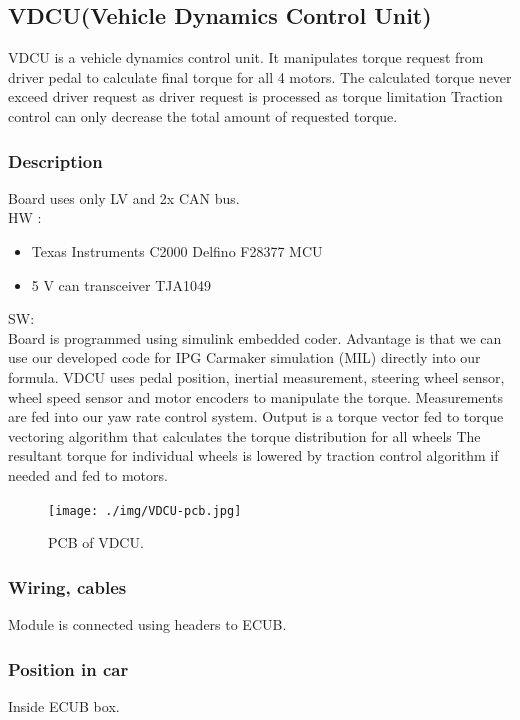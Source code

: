 \subsection{VDCU(Vehicle Dynamics Control Unit)}
VDCU is a vehicle dynamics control unit. It manipulates torque request from driver pedal to calculate final torque for all 4 motors. The calculated torque never exceed driver request as driver request is processed as torque limitation Traction control can only decrease the total amount of requested torque.

\subsubsection{Description}
Board uses only LV and 2x CAN bus.\\
HW :
\begin{itemize}
\item Texas Instruments C2000 Delfino F28377 MCU\\
\item 5 V can transceiver TJA1049\\
\end{itemize}

\noindent SW:\\
Board is programmed using simulink embedded coder. Advantage is that we can use our developed code for IPG Carmaker simulation (MIL) directly into our formula. VDCU uses pedal position, inertial measurement, steering wheel sensor, wheel speed sensor and motor encoders to manipulate the torque. Measurements are fed into our yaw rate control system. Output is a torque vector fed to torque vectoring algorithm that calculates the torque distribution for all wheels The resultant torque for individual wheels is lowered by traction control algorithm if needed and fed to motors.

\begin{figure}[H]
	\centering
	\texttt{[image: ./img/VDCU-pcb.jpg]}
	\caption{PCB of VDCU.}
	\label{fig:VDCU-pcb}
\end{figure}

\subsubsection{Wiring, cables}
Module is connected using headers to ECUB.

\subsubsection{Position in car}
Inside ECUB box.

